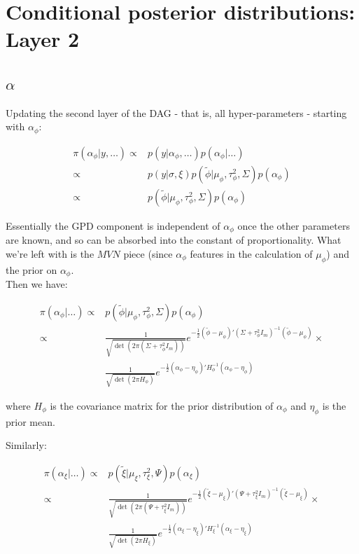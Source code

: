 \documentclass{article}
\begin{document}
\section{Conditional posterior distributions: Layer 2}

\subsection{$\alpha$}

Updating the second layer of the DAG - that is, all hyper-parameters - starting with $\alpha_\phi$:

\begin{align*}
\pi(\alpha_\phi | y, \dots ) \propto & p(y | \alpha_\phi, \dots ) p(\alpha_\phi | \dots) \\
\propto & p(y | \sigma, \xi)  p(\tilde{\phi} | \mu_\phi, \tau^2_\phi, \Sigma) p(\alpha_\phi) \\
\propto & p(\tilde{\phi} | \mu_\phi, \tau^2_\phi, \Sigma) p(\alpha_\phi)
\end{align*}

Essentially the GPD component is independent of $\alpha_\phi$ once the other parameters are known, and so can be absorbed into the constant of proportionality. What we're left with is the $MVN$ piece (since $\alpha_\phi$ features in the calculation of $\mu_\phi$) and the prior on $\alpha_\phi$. \\

Then we have:

\begin{align*}
\pi(\alpha_\phi | \dots ) \propto & p(\tilde{\phi} | \mu_\phi, \tau^2_\phi, \Sigma) p(\alpha_\phi) \\
\propto & \frac{1}{\sqrt{\det(2 \pi (\Sigma + \tau^2_\phi I_m))}} e^{-\frac{1}{2} (\tilde{\phi} - \mu_\phi)' (\Sigma + \tau^2_\phi I_m)^{-1} (\tilde{\phi} - \mu_\phi) } \times \\
& \frac{1}{\sqrt{\det(2 \pi H_\phi)}} e^{-\frac{1}{2} (\alpha_\phi - \eta_\phi)' H_\phi^{-1} (\alpha_\phi - \eta_\phi) }
\end{align*}

where $H_\phi$ is the covariance matrix for the prior distribution of $\alpha_\phi$ and $\eta_\phi$ is the prior mean.

Similarly:

\begin{align*}
\pi(\alpha_\xi | \dots ) \propto & p(\tilde{\xi} | \mu_\xi, \tau^2_\xi, \Psi) p(\alpha_\xi) \\
\propto & \frac{1}{\sqrt{\det(2 \pi (\Psi + \tau^2_\xi I_m))}} e^{-\frac{1}{2} (\tilde{\xi} - \mu_\xi)' (\Psi + \tau^2_\xi I_m)^{-1} (\tilde{\xi} - \mu_\xi) } \times \\
& \frac{1}{\sqrt{\det(2 \pi H_\xi)}} e^{-\frac{1}{2} (\alpha_\xi - \eta_\xi)' H_\xi^{-1} (\alpha_\xi - \eta_\xi) }
\end{align*}
\end{document}
